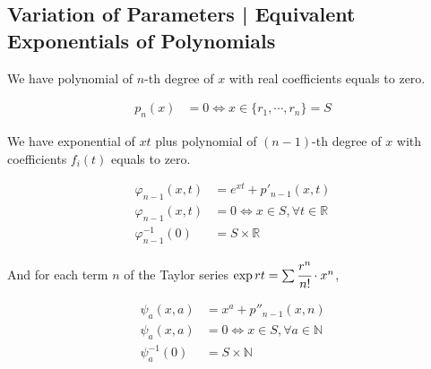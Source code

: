 \documentclass[12pt,a4paper]{article}
\begin{document}
\subsection{Variation of Parameters | Equivalent Exponentials of Polynomials}

\begin{flushright}
\end{flushright}

We have polynomial of $n$-th degree of $x$ with real coefficients equals to zero.

\begin{align}
p_n(x) &= 0 \Leftrightarrow x \in \{ r_1, \cdots, r_n \} = S
\end{align}

We have exponential of $xt$ plus polynomial of $(n-1)$-th degree of $x$ with coefficients $f_i(t)$ equals to zero.

\begin{align}
\varphi_{n - 1}(x, t) &= e^{xt} + p'_{n-1}(x, t) \\
\varphi_{n - 1}(x, t) &= 0 \Leftrightarrow x \in S, \forall t \in \mathbb{R} \\
\varphi_{n - 1}^{-1}(0) &= S \times \mathbb{R}
\end{align}

And for each term $n$ of the Taylor series $\exp rt = \sum \cfrac{r^n}{n!} \cdot x^n$,

\begin{align}
\psi_a(x, a) &= x^a + p''_{n-1}(x, n) \\
\psi_a(x, a) &= 0 \Leftrightarrow x \in S, \forall a \in \mathbb{N} \\
\psi_a^{-1}(0) &= S \times \mathbb{N}
\end{align}

\vspace{3mm}
\end{document}
